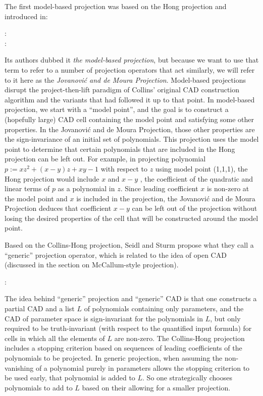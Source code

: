 \documentclass{article}
\begin{document}
The first model-based projection was based on the Hong projection and
introduced in:
%
\begin{description}
\item[\autocite{JovanovicdeMoura:12} :]  
\item[\autocite{Jovanovic:2013} :]  
\end{description}
%
Its authors dubbed it \emph{the model-based projection}, but because
we want to use that term to refer to a number of projection
operators that act similarly, we will refer to it here as the
\emph{Jovanovi\'c and de Moura Projection}.
Model-based projections disrupt the project-then-lift paradigm of
Collins' original CAD construction algorithm and the variants that had
followed it up to that point.  In model-based projection, we start
with a ``model point'', and the goal is to construct a (hopefully
large) CAD cell containing the model point and satisfying some other
properties.  In the Jovanovi\'c and de Moura Projection, those other
properties are the sign-invariance of an initial set of polynomials.
This projection uses the model point to determine that certain
polynomials that are included in the Hong projection can be left out.
For example, in projecting polynomial $p := x z^2 + (x - y) z + x y - 1$ with respect
to $z$ using model point (1,1,1), the Hong projection would include
$x$ and $x - y$ , the coefficient of the quadratic and
linear terms of $p$ as a polynomial in $z$.  Since leading coefficient
$x$ is non-zero at the model
point and $x$ is included in the projection, the 
Jovanovi\'c and de Moura Projection deduces that coefficient $x-y$ can
be left out of the projection without losing the desired properties of
the cell that will be constructed around the model point.  

Based on the Collins-Hong projection, Seidl and Sturm propose what
they call a ``generic'' projection 
operator, which is related to the idea of open CAD
(discussed in the section on McCallum-style projection).
%
\begin{description}
\item[\autocite{SeidlSturm:03b} :]  
\end{description}
%
The idea behind ``generic'' projection and ``generic'' CAD is that
one constructs a partial CAD and a list $L$ of polynomials containing only
parameters, and the CAD of parameter space is sign-invariant for the
polynomials in $L$, but only required to be truth-invariant
(with respect to the quantified input formula) for cells in which all
the elements of $L$ are non-zero.  The Collins-Hong projection
includes a stopping criterion based on sequences of leading
coefficients of the polynomials to be projected.  In generic
projection, when assuming the non-vanishing of a polynomial purely in
parameters allows the stopping criterion to be used early, that
polynomial is added to $L$.  So one strategically chooses polynomials
to add to $L$ based on their allowing for a smaller projection.
\end{document}
